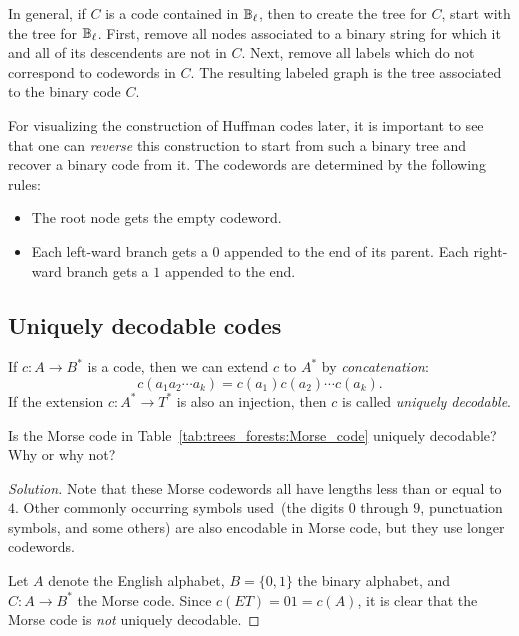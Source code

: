 In general, if $C$ is a code contained in $\mathbb{B}_\ell$, then to create
the tree for $C$, start with the tree for $\mathbb{B}_\ell$. First, remove
all nodes associated to a binary string for which it and all of its
descendents are not in $C$. Next, remove all labels which do not
correspond to codewords in $C$. The resulting labeled graph is the
tree associated to the binary code $C$.

For visualizing the construction of Huffman codes later, it is
important to see that one can \emph{reverse} this construction to
start from such a binary tree and recover a binary code from it. The
codewords are determined by the following rules:
%
\begin{itemize}
\item The root node gets the empty codeword.

\item Each left-ward branch gets a $0$ appended to the end of its
  parent. Each right-ward branch gets a $1$ appended to the end.
\end{itemize}



\subsection{Uniquely decodable codes}

If $c: A \longrightarrow B^*$ is a code, then we can extend $c$ to
$A^*$ by \emph{concatenation}:
\[
c(a_1 a_2 \cdots a_k)
=
c(a_1) c(a_2) \cdots c(a_k).
\]
If the extension $c: A^* \longrightarrow T^*$ is also an injection,
then $c$ is called \emph{uniquely decodable}.

\begin{example}
Is the Morse code in
Table~\ref{tab:trees_forests:Morse_code} uniquely decodable? Why or
why not?
\end{example}

\begin{proof}[Solution]
Note that these Morse codewords all have lengths less than or equal to
$4$. Other commonly occurring symbols used~(the digits $0$ through
$9$, punctuation symbols, and some others) are also encodable in Morse
code, but they use longer codewords.

Let $A$ denote the English alphabet, $B = \{0, 1\}$ the binary
alphabet, and $C: A \longrightarrow B^*$ the Morse code. Since
$c(ET) = 01 = c(A)$, it is clear that the Morse code is \emph{not}
uniquely decodable.
\end{proof}

